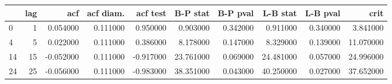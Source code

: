 \begin{tabular}{lrrrrrrrrr}
\toprule
 & lag & acf & acf diam. & acf test & B-P stat & B-P pval & L-B stat & L-B pval & crit \\
\midrule
0 & 1 & 0.054000 & 0.111000 & 0.950000 & 0.903000 & 0.342000 & 0.911000 & 0.340000 & 3.841000 \\
4 & 5 & 0.022000 & 0.111000 & 0.386000 & 8.178000 & 0.147000 & 8.329000 & 0.139000 & 11.070000 \\
14 & 15 & -0.052000 & 0.111000 & -0.917000 & 23.761000 & 0.069000 & 24.481000 & 0.057000 & 24.996000 \\
24 & 25 & -0.056000 & 0.111000 & -0.983000 & 38.351000 & 0.043000 & 40.250000 & 0.027000 & 37.652000 \\
\bottomrule
\end{tabular}

